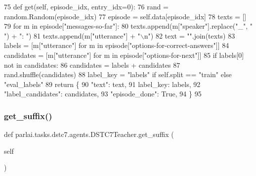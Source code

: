 \begin{DoxyCode}
75     \textcolor{keyword}{def }get(self, episode\_idx, entry\_idx=0):
76         rand = random.Random(episode\_idx)
77         episode = self.data[episode\_idx]
78         texts = []
79         \textcolor{keywordflow}{for} m \textcolor{keywordflow}{in} episode[\textcolor{stringliteral}{"messages-so-far"}]:
80             texts.append(m[\textcolor{stringliteral}{"speaker"}].replace(\textcolor{stringliteral}{"\_"}, \textcolor{stringliteral}{" "}) + \textcolor{stringliteral}{": "})
81             texts.append(m[\textcolor{stringliteral}{"utterance"}] + \textcolor{stringliteral}{"\(\backslash\)n"})
82         text = \textcolor{stringliteral}{""}.join(texts)
83         labels = [m[\textcolor{stringliteral}{"utterance"}] \textcolor{keywordflow}{for} m \textcolor{keywordflow}{in} episode[\textcolor{stringliteral}{"options-for-correct-answers"}]]
84         candidates = [m[\textcolor{stringliteral}{"utterance"}] \textcolor{keywordflow}{for} m \textcolor{keywordflow}{in} episode[\textcolor{stringliteral}{"options-for-next"}]]
85         \textcolor{keywordflow}{if} labels[0] \textcolor{keywordflow}{not} \textcolor{keywordflow}{in} candidates:
86             candidates = labels + candidates
87         rand.shuffle(candidates)
88         label\_key = \textcolor{stringliteral}{"labels"} \textcolor{keywordflow}{if} self.split == \textcolor{stringliteral}{"train"} \textcolor{keywordflow}{else} \textcolor{stringliteral}{"eval\_labels"}
89         \textcolor{keywordflow}{return} \{
90             \textcolor{stringliteral}{"text"}: text,
91             label\_key: labels,
92             \textcolor{stringliteral}{"label\_candidates"}: candidates,
93             \textcolor{stringliteral}{"episode\_done"}: \textcolor{keyword}{True},
94         \}
95 
\end{DoxyCode}
\mbox{\label{classparlai_1_1tasks_1_1dstc7_1_1agents_1_1DSTC7Teacher_a2355675a4798e716d6d5788ba9de109e}} 
\subsubsection{\texorpdfstring{get\+\_\+suffix()}{get\_suffix()}}
{\footnotesize\ttfamily def parlai.\+tasks.\+dstc7.\+agents.\+D\+S\+T\+C7\+Teacher.\+get\+\_\+suffix (\begin{DoxyParamCaption}\item[{}]{self }\end{DoxyParamCaption})}



